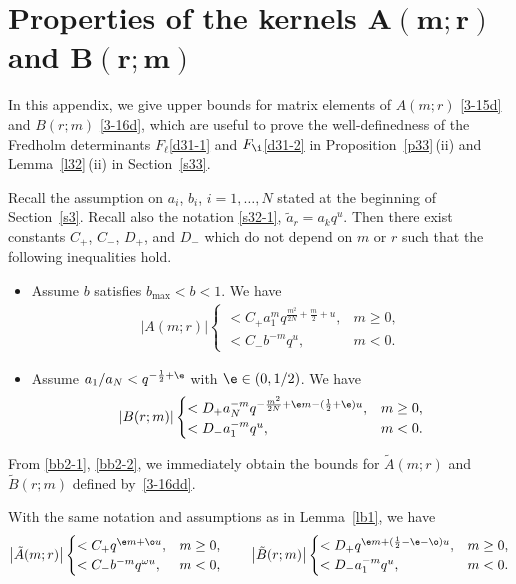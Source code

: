 \section[Properties of the kernels A(m;r) and B(r;m)]{Properties of the kernels $\boldsymbol{A(m;r)}$ and $\boldsymbol{B(r;m)}$}
\label{ab}
 In this appendix, we give upper bounds for matrix elements of $A(m;r)$ \eqref{3-15d} and $B(r;m)$ \eqref{3-16d}, which are useful to prove the well-definedness of the Fredholm determinants $F_{\ell}$\eqref{d31-1} and $F_{\i}$\eqref{d31-2} in Proposition~\ref{p33}\,(ii) and Lemma~\ref{l32}\,(ii) in Section~\ref{s33}.
\begin{Lemma}
\label{lb1}
Recall the assumption on $a_i$, $b_i$, $i=1,\dots,N$ stated at the beginning of Section~{\rm\ref{s3}}. Recall also the notation \eqref{s32-1}, $\tilde{a}_r=a_k q^{u}$. Then there exist constants $C_+$, $C_-$, $D_+$, and $D_-$ which do not depend on $m$ or
$r$ such that the following inequalities hold.
\begin{itemize}\itemsep=0pt
 \item [$(i)$] Assume $b$ satisfies $b_{\max}<b<1$. We have
 \begin{align}
 \label{bb2-1}
 |A(m;r)|
 \begin{cases}
 < C_+ a_{1}^mq^{\frac{m^2}{2N}+\frac{m}{2}+u}, & m\ge 0,
 \\
 < C_- b^{-m} q^{u}, & m<0.
 \end{cases}
 \end{align}
 \item[$(ii)$] Assume $a_{1}/a_{N}<q^{-\frac12+\e}$ with $\e\in(0,1/2)$. We have
 \begin{align}
 \label{bb2-2}
 |B(r;m)|
 \begin{cases}
 < D_+ a_{N}^{-m}q^{-\frac{m^2}{2N}+\e m-(\frac12+\e)u}, & m\ge 0,
 \\
 < D_- a_{1}^{-m}q^{u}, & m<0.
 \end{cases}
 \end{align}
\end{itemize}
\end{Lemma}

From \eqref{bb2-1}, \eqref{bb2-2}, we immediately obtain the bounds
for $\tilde{A}(m;r)$ and $\tilde{B}(r;m)$ defined by~\eqref{3-16dd}.

\begin{Corollary}\label{cb2}
With the same notation and assumptions as in Lemma~{\rm\ref{lb1}},
we have
\begin{align*}%
 \big|\tilde{A}(m;r)\big|
 \begin{cases}
 < C_+ q^{\e m+\o u}, & m\ge 0,
 \\
 < C_- b^{-m} q^{\omega u}, & m<0,
 \end{cases}
 \qquad
 \big|\tilde{B}(r;m)\big|
 \begin{cases}
 < D_+ q^{\e m+(\frac12-\e-\o)u}, & m\ge 0,
 \\
 < D_- a_1^{-m}q^{u}, & m<0.
 \end{cases}
 \end{align*}
 \end{Corollary}

